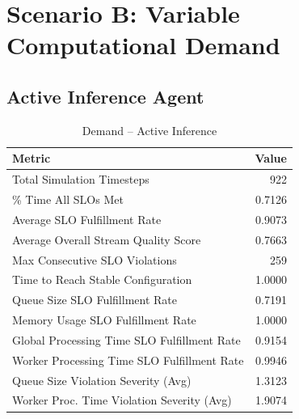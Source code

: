 \clearpage
\section{Scenario B: Variable Computational Demand}

\subsection*{Active Inference Agent}
\begin{table}[h]
\centering
\caption{Demand – Active Inference}
\label{tab:demand_active_inference}
\begin{tabular}{lr}
\toprule
Metric & Value \\
\midrule
Total Simulation Timesteps & 922 \\
\% Time All SLOs Met & 0.7126 \\
Average SLO Fulfillment Rate & 0.9073 \\
Average Overall Stream Quality Score & 0.7663 \\
Max Consecutive SLO Violations & 259 \\
Time to Reach Stable Configuration & 1.0000 \\
Queue Size SLO Fulfillment Rate & 0.7191 \\
Memory Usage SLO Fulfillment Rate & 1.0000 \\
Global Processing Time SLO Fulfillment Rate & 0.9154 \\
Worker Processing Time SLO Fulfillment Rate & 0.9946 \\
Queue Size Violation Severity (Avg) & 1.3123 \\
Worker Proc. Time Violation Severity (Avg) & 1.9074 \\
\bottomrule
\end{tabular}
\end{table}


